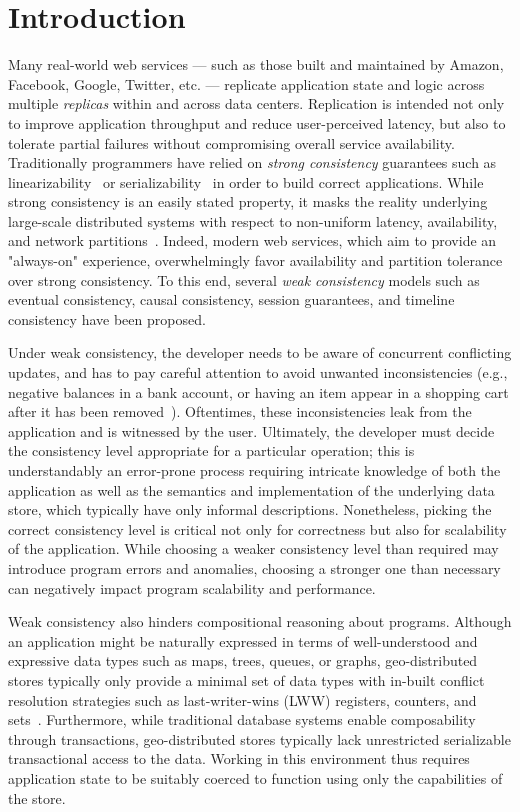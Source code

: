 \section{Introduction}

Many real-world web services --- such as those built and maintained by Amazon,
Facebook, Google, Twitter, etc. --- replicate application state and logic
across multiple \emph{replicas} within and across data centers. Replication is
intended not only to improve application throughput and reduce user-perceived
latency, but also to tolerate partial failures without compromising overall
service availability. Traditionally programmers have relied on \emph{strong
consistency} guarantees such as linearizability~\cite{Herlihy1990} or
serializability~\cite{Serializability} in order to build correct applications.
While strong consistency is an easily stated property, it masks the reality
underlying large-scale distributed systems with respect to non-uniform latency,
availability, and network partitions~\cite{Brewer2000,Gilbert2002}. Indeed,
modern web services, which aim to provide an "always-on" experience,
overwhelmingly favor availability and partition tolerance over strong
consistency. To this end, several \emph{weak consistency} models such as
eventual consistency, causal consistency, session guarantees, and timeline
consistency have been proposed.

Under weak consistency, the developer needs to be aware of concurrent
conflicting updates, and has to pay careful attention to avoid unwanted
inconsistencies (e.g., negative balances in a bank account, or having an item
appear in a shopping cart after it has been removed~\cite{Dynamo}). Oftentimes,
these inconsistencies leak from the application and is witnessed by the user.
Ultimately, the developer must decide the consistency level appropriate for a
particular operation; this is understandably an error-prone process requiring
intricate knowledge of both the application as well as the semantics and
implementation of the underlying data store, which typically have only informal
descriptions. Nonetheless, picking the correct consistency level is critical
not only for correctness but also for scalability of the application. While
choosing a weaker consistency level than required may introduce program errors
and anomalies, choosing a stronger one than necessary can negatively impact
program scalability and performance.

Weak consistency also hinders compositional reasoning about programs.  Although an
application might be naturally expressed in terms of well-understood and
expressive data types such as maps, trees, queues, or graphs, geo-distributed
stores typically only provide a minimal set of data types with in-built
conflict resolution strategies such as last-writer-wins (LWW) registers,
counters, and sets~\cite{Cassandra,DynamoDB}.  Furthermore, while traditional
database systems enable composability through transactions, geo-distributed
stores typically lack unrestricted serializable transactional access to the
data. Working in this environment thus requires application state to be
suitably coerced to function using only the capabilities of the store.


